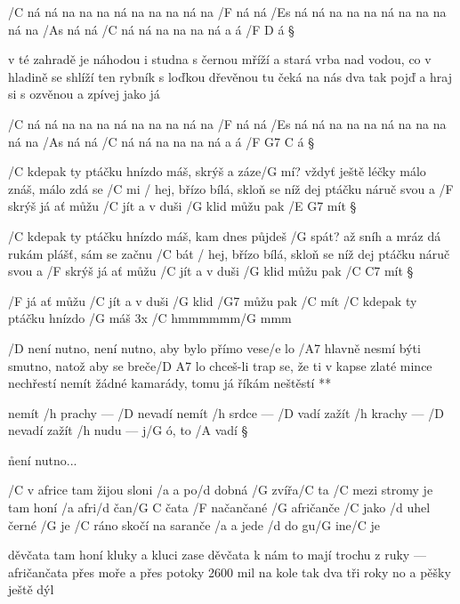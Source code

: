 /C ná ná na na na ná na na na ná na /F ná ná
/Es ná ná na na na ná na na na ná na /As ná ná
/C ná ná na na na ná a á /{F D} á \S

v té zahradě je náhodou i studna s černou mříží
a stará vrba nad vodou, co v hladině se shlíží
ten rybník s loďkou dřevěnou tu čeká na nás dva
tak pojď a hraj si s ozvěnou a zpívej jako já \s

/C ná ná na na na ná na na na ná na /F ná ná
/Es ná ná na na na ná na na na ná na /As ná ná
/C ná ná na na na ná a á /{F G7 C} á \S




/C kdepak ty ptáčku hnízdo máš, skrýš a záze/G mí? 
vždyť ještě léčky málo znáš, málo zdá se /C mi 
/ hej, břízo bílá, skloň se níž
dej ptáčku náruč svou a /F skrýš 
já ať můžu /C jít a v duši /G klid 
můžu pak /{E G7} mít \S

/C kdepak ty ptáčku hnízdo máš, kam dnes půjdeš /G spát? 
až sníh a mráz dá rukám plášť, sám se začnu /C bát 
/ hej, břízo bílá, skloň se níž
dej ptáčku náruč svou a /F skrýš 
já ať můžu /C jít a v duši /G klid 
můžu pak /{C C7} mít \S

/F já ať můžu /C jít a v duši /G klid /G7 můžu pak /C mít 
/C kdepak ty ptáčku hnízdo /G máš \qquad 3x
/C hmmmmmm/G mmm




\R  /D není nutno, není nutno, aby bylo přímo vese/e lo
    /A7 hlavně nesmí býti smutno, natož aby se breče/{D A7} lo \s
    chceš-li trap se, že ti v kapse zlaté mince nechřestí
    nemít žádné kamarády, tomu já říkám neštěstí **

nemít /h prachy --- /D nevadí
nemít /h srdce --- /D vadí
zažít /h krachy --- /D nevadí
zažít /h nudu --- j/G ó, to /A vadí \S

\r není nutno...




/C v africe tam žijou sloni
/a a po/d dobná /G zvířa/C ta
/C mezi stromy je tam honí /a afri/d čan/{G C} čata
/F načančané /G afričanče /C jako /d uhel černé /G je
/C ráno skočí na saranče
/a a jede /d do gu/G ine/C je \s

děvčata tam honí kluky
a kluci zase děvčata
k nám to mají trochu z ruky --- afričančata
přes moře a přes potoky 2600 mil
na kole tak dva tři roky
no a pěšky ještě dýl \s

